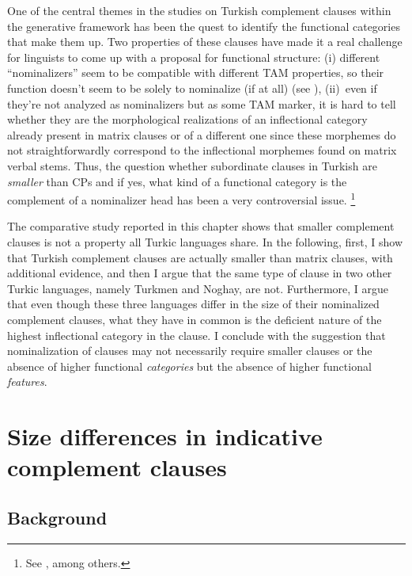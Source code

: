 \documentclass[output=paper]{langsci/langscibook}
\begin{document}
One of the central themes in the studies on Turkish complement clauses within the generative framework has been the quest 
to identify the functional categories that make them up. 
Two properties of these clauses have made it a real challenge for linguists to come up with a proposal for functional structure: 
(i) different ``nominalizers'' seem to be compatible with different TAM properties, 
so their function doesn't seem to be solely to nominalize (if at all) (see \citealt{Kelepir2015}), 
(ii)~even if they're not analyzed as nominalizers but as some TAM marker, it is hard to tell whether they are 
the morphological realizations of an inflectional category already present in matrix clauses 
or of a different one since these morphemes do not straightforwardly correspond to the inflectional morphemes found on matrix verbal stems. 
Thus, the question whether subordinate clauses in Turkish are \textit{smaller} than CPs 
and if yes, what kind of a functional category is the complement of a nominalizer head has been a very controversial issue.%
\footnote{See \citealt{Kural1993,Kural1994,Kural1998,Kennelly1996,Goksel1997,Aygen2002,Kornfilt2007}, among others.} 

The comparative study reported in this chapter shows that smaller complement clauses is not a property all Turkic languages share. 
In the following, first, I show that Turkish complement clauses are actually smaller than matrix clauses, with additional evidence, 
and then I argue that the same type of clause in two other Turkic languages, namely Turkmen and Noghay, are not. 
Furthermore, I argue that even though these three languages differ in the size of their nominalized complement clauses, 
what they have in common is the deficient nature of the highest inflectional category in the clause. 
I conclude with the suggestion that nominalization of clauses may not necessarily require smaller clauses 
or the absence of higher functional \textit{categories} but the absence of higher functional \textit{features}.

\section{Size differences in indicative complement clauses} 
\label{kelepirsec:key:2}

\subsection{Background} 
\label{kelepirsec:key:2.1}
\end{document}
